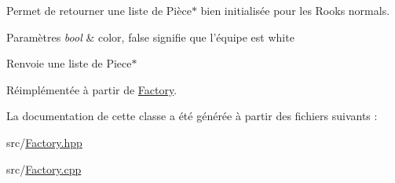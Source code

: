 Permet de retourner une liste de Pièce$\ast$ bien initialisée pour les Rooks normals. 


\begin{DoxyParams}{Paramètres}
{\em bool} & color, false signifie que l'équipe est white \\
\hline
\end{DoxyParams}
\begin{DoxyReturn}{Renvoie}
une liste de Piece$\ast$ 
\end{DoxyReturn}


Réimplémentée à partir de \hyperlink{class_factory_a90f20f663caa6e5a5370465d3014630f}{Factory}.



La documentation de cette classe a été générée à partir des fichiers suivants \-:\begin{DoxyCompactItemize}
\item 
src/\hyperlink{_factory_8hpp}{Factory.\-hpp}\item 
src/\hyperlink{_factory_8cpp}{Factory.\-cpp}\end{DoxyCompactItemize}

